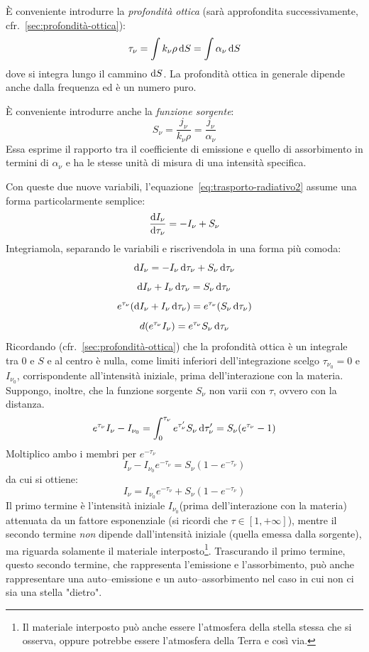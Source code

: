 È conveniente introdurre la \emph{profondità ottica} (sarà approfondita successivamente, cfr.~\ref{sec:profondità-ottica}):
\begin{equation}\label{eq:profondità-ottica}
        \tau_\nu = \int k_\nu \rho \mathop{\mathrm{{}d}}\mathopen{} S = \int \alpha_\nu \mathop{\mathrm{{}d}}\mathopen{} S
\end{equation}
dove si integra lungo il cammino $\mathop{\mathrm{{}d}}\mathopen{} S$. La profondità ottica in generale dipende anche dalla frequenza ed è un numero puro. 

È conveniente introdurre anche la \emph{funzione sorgente}:
\begin{equation}\label{eq:funzione-sorgente}
    S_\nu = \frac{j_\nu}{k_\nu \rho} = \frac{j_\nu}{\alpha_\nu}
\end{equation}
Essa esprime il rapporto tra il coefficiente di emissione e quello di assorbimento in termini di $\alpha_\nu$ e ha le stesse unità di misura di una intensità specifica.

Con queste due nuove variabili, l'equazione~\eqref{eq:trasporto-radiativo2} assume una forma particolarmente semplice:
\begin{equation}\label{eq:trasporto-radiativo3}
    \frac{\mathop{\mathrm{{}d}}\mathopen{} I_\nu}{\mathop{\mathrm{{}d}}\mathopen{} \tau_\nu} = -I_\nu + S_\nu
\end{equation}
Integriamola, separando le variabili e riscrivendola in una forma più comoda:
\[
    \mathop{\mathrm{{}d}}\mathopen{} I_\nu = -I_\nu \mathop{\mathrm{{}d}}\mathopen{} \tau_\nu  + S_\nu \mathop{\mathrm{{}d}}\mathopen{} \tau_\nu
\]
\[
    \mathop{\mathrm{{}d}}\mathopen{} I_\nu + I_\nu \mathop{\mathrm{{}d}}\mathopen{} \tau_\nu  = S_\nu \mathop{\mathrm{{}d}}\mathopen{} \tau_\nu
\]
\[
    e^{\tau_\nu} (\mathop{\mathrm{{}d}}\mathopen{} I_\nu + I_\nu \mathop{\mathrm{{}d}}\mathopen{} \tau_\nu)  = e^{\tau_\nu} (S_\nu \mathop{\mathrm{{}d}}\mathopen{} \tau_\nu)
\]
\[
    d(e^{\tau_\nu} I_\nu) = e^{\tau_\nu} S_\nu \mathop{\mathrm{{}d}}\mathopen{} \tau_\nu
\]
Ricordando (cfr.~\ref{sec:profondità-ottica}) che la profondità ottica è un integrale tra $0$ e $S$ e al centro è nulla, come limiti inferiori dell'integrazione scelgo $\tau_{\nu_0} = 0$ e $I_{\nu_0}$, corrispondente all'intensità iniziale, prima dell'interazione con la materia. Suppongo, inoltre, che la funzione sorgente $S_\nu$ non varii con $\tau$, ovvero con la distanza.
\[
    e^{\tau_\nu} I_\nu - I_{\nu_0} = \int_0^{\tau_\nu} e^{\tau_\nu'} S_\nu \mathop{\mathrm{{}d}}\mathopen{} \tau_\nu' = S_\nu (e^{\tau_\nu} - 1)
\]
Moltiplico ambo i membri per $e^{-\tau_\nu}$
\[
    I_\nu - I_{\nu_0} e^{-\tau_\nu} = S_\nu (1-e^{-\tau_\nu})
\]
da cui si ottiene:
\begin{equation}\label{eq:soluzione-trasporto-radiativo}
    I_\nu = I_{\nu_0} e^{-\tau_\nu} + S_\nu (1- e^{-\tau_\nu})
\end{equation}
Il primo termine è l'intensità iniziale $I_{\nu_0}$(prima dell'interazione con la materia) attenuata da un fattore esponenziale (si ricordi che $\tau \in [1,+\infty]$), mentre il secondo termine \emph{non} dipende dall'intensità iniziale (quella emessa dalla sorgente), ma riguarda solamente il materiale interposto\footnote{Il materiale interposto può anche essere l'atmosfera della stella stessa che si osserva, oppure potrebbe essere l'atmosfera della Terra e così via.}. Trascurando il primo termine, questo secondo termine, che rappresenta l'emissione e l'assorbimento, può anche rappresentare una auto--emissione e un auto--assorbimento nel caso in cui non ci sia una stella "dietro".

